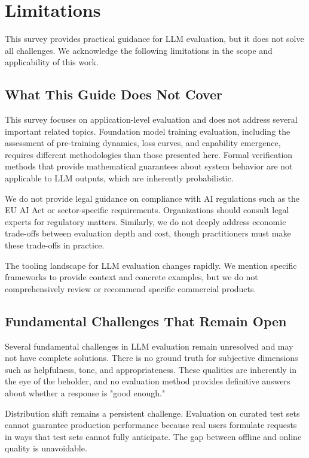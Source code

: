 
\section{Limitations}
\label{sec:limitations}

This survey provides practical guidance for LLM evaluation, but it does not solve all challenges. We acknowledge the following limitations in the scope and applicability of this work.

\subsection{What This Guide Does Not Cover}

This survey focuses on application-level evaluation and does not address several important related topics. Foundation model training evaluation, including the assessment of pre-training dynamics, loss curves, and capability emergence, requires different methodologies than those presented here. Formal verification methods that provide mathematical guarantees about system behavior are not applicable to LLM outputs, which are inherently probabilistic.

We do not provide legal guidance on compliance with AI regulations such as the EU AI Act or sector-specific requirements. Organizations should consult legal experts for regulatory matters. Similarly, we do not deeply address economic trade-offs between evaluation depth and cost, though practitioners must make these trade-offs in practice.

The tooling landscape for LLM evaluation changes rapidly. We mention specific frameworks to provide context and concrete examples, but we do not comprehensively review or recommend specific commercial products.

\subsection{Fundamental Challenges That Remain Open}

Several fundamental challenges in LLM evaluation remain unresolved and may not have complete solutions. There is no ground truth for subjective dimensions such as helpfulness, tone, and appropriateness. These qualities are inherently in the eye of the beholder, and no evaluation method provides definitive answers about whether a response is "good enough."

Distribution shift remains a persistent challenge. Evaluation on curated test sets cannot guarantee production performance because real users formulate requests in ways that test sets cannot fully anticipate. The gap between offline and online quality is unavoidable.

